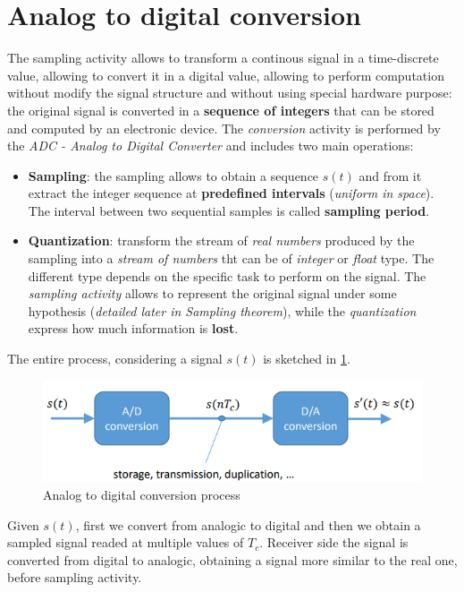 \documentclass[10pt,a4paper]{report}
\theoremstyle{definition}
\begin{document}
\section{Analog to digital conversion}\label{sec:analog-to-digital-conversion}
The sampling activity allows to transform a continous signal in a time-discrete value, allowing to convert it in a digital value, allowing to perform computation without modify the signal structure and without using special hardware purpose: the original signal is converted in a \textbf{sequence of integers} that can be stored and computed by an electronic device.
The \textit{conversion} activity is performed by the \textit{ADC - Analog to Digital Converter} and includes two main operations:
\begin{itemize}
	\item 
	\textbf{Sampling}: the sampling allows to obtain a sequence $s(t)$ and from it extract the integer sequence at \textbf{predefined intervals} (\textit{uniform in space}). The interval between two sequential samples is called \textbf{sampling period}.
	\item 
	\textbf{Quantization}: transform the stream of \textit{real numbers} produced by the sampling into a \textit{stream of numbers} tht can be of \textit{integer} or \textit{float} type. The different type depends on the specific task to perform on the signal.
	The \textit{sampling activity} allows to represent the original signal under some hypothesis (\textit{detailed later in Sampling theorem}), while the \textit{quantization} express how much information is \textbf{lost}.
\end{itemize}

The entire process, considering a signal $s(t)$ is sketched in \ref{ad-conversion}.
\begin{figure}[h]
	\centering\includegraphics[scale=0.50]{images/Pasted image 20230526111003.png}
	\caption{Analog to digital conversion process}
	\label{ad-conversion}
\end{figure}

Given $s(t)$, first we convert from analogic to digital and then we obtain a sampled signal readed at multiple values of $T_{c}$. Receiver side the signal is converted from digital to analogic, obtaining a signal more similar to the real one, before sampling activity.
\end{document}
